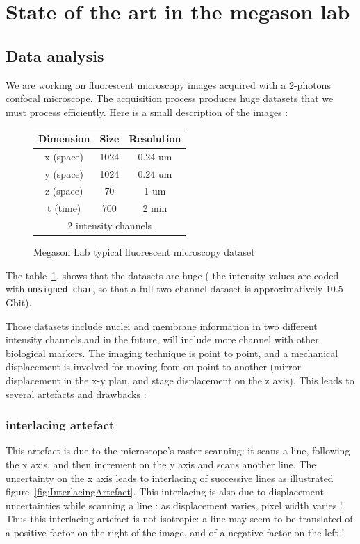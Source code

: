 %
%

\section{State of the art in the megason lab}


\subsection{Data analysis}

We are working on fluorescent microscopy images acquired with a 2-photons confocal microscope. The acquisition process produces huge datasets that we must process efficiently.
Here is a small description of the images :
\begin{figure}[htb]
\begin{center}
\begin{tabular}{|c|c|c|}
\hline Dimension & Size & Resolution \\ 
\hline x (space) & 1024 & 0.24 um \\ 
\hline y (space) & 1024 & 0.24 um \\ 
\hline z (space) & 70 & 1 um \\ 
\hline t (time) & 700 & 2 min\\ 
\hline \multicolumn{3}{|c|}{ 2 intensity channels} \\ 
\hline
\end{tabular} 
\end{center}
\caption{Megason Lab typical fluorescent microscopy dataset}
\label{tab:DataSizes}
\end{figure}
The table~\ref{tab:DataSizes}, shows that the datasets are huge ( the intensity values are coded with {\verb+unsigned char+}, so that a full two channel dataset is approximatively  10.5 Gbit).

Those datasets include nuclei and membrane information in two different intensity channels,and in the future, will include more channel with other biological markers. The imaging technique is point to point, and a mechanical displacement is involved for moving from on point to another (mirror displacement in the x-y plan, and stage displacement on the z axis). This leads to several artefacts and drawbacks :

\subsubsection{interlacing artefact}
This artefact is due to the microscope's raster scanning: it scans a line, following the x axis, and then increment on the y axis and scans another line.
The uncertainty on the x axis leads to interlacing of successive lines as illustrated figure~\ref{fig:InterlacingArtefact}.
This interlacing is also due to displacement uncertainties while scanning a line : as displacement varies, pixel width varies !
Thus this interlacing artefact is not isotropic: a line may seem to be translated of a positive factor on the right of the image, and of a negative factor on the left !


